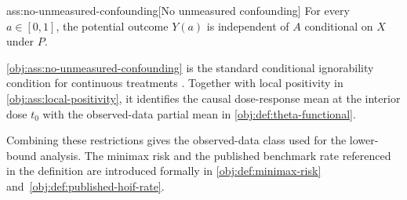 \documentclass[11pt]{article}
\begin{document}
\begin{assumptionv}{ass:no-unmeasured-confounding}[No unmeasured confounding]
For every \(a\in[0,1]\), the potential outcome \(Y(a)\) is independent of \(A\) conditional on \(X\) under \(P\).
\end{assumptionv}

\cref{obj:ass:no-unmeasured-confounding} is the standard conditional ignorability condition for continuous treatments \citep{kennedy2017}. Together with local positivity in \cref{obj:ass:local-positivity}, it identifies the causal dose-response mean at the interior dose \(t_0\) with the observed-data partial mean in \cref{obj:def:theta-functional}.

Combining these restrictions gives the observed-data class used for the lower-bound analysis. The minimax risk and the published benchmark rate referenced in the definition are introduced formally in \cref{obj:def:minimax-risk} and~\cref{obj:def:published-hoif-rate}.
\end{document}
